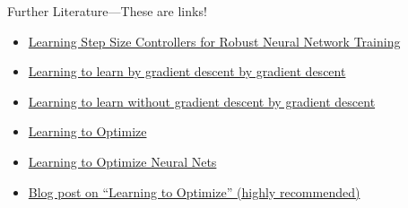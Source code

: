 \begin{frame}[c]{Further Literature---These are links!}

\begin{itemize}
  \item \href{https://www.aaai.org/ocs/index.php/AAAI/AAAI16/paper/download/11763/11767}{Learning Step Size Controllers for Robust Neural Network Training}
  \item \href{https://arxiv.org/abs/1606.04474}{Learning to learn by gradient descent by gradient descent}
  \item \href{http://proceedings.mlr.press/v70/chen17e/chen17e.pdf}{Learning to learn without gradient descent by gradient descent}
  \item \href{https://arxiv.org/pdf/1606.01885.pdf}{Learning to Optimize}
  \item \href{https://arxiv.org/pdf/1703.00441.pdf}{Learning to Optimize Neural Nets}
  \item \href{https://bair.berkeley.edu/blog/2017/09/12/learning-to-optimize-with-rl/}{Blog post on ``Learning to Optimize'' (highly recommended)}
\end{itemize}

\end{frame}
